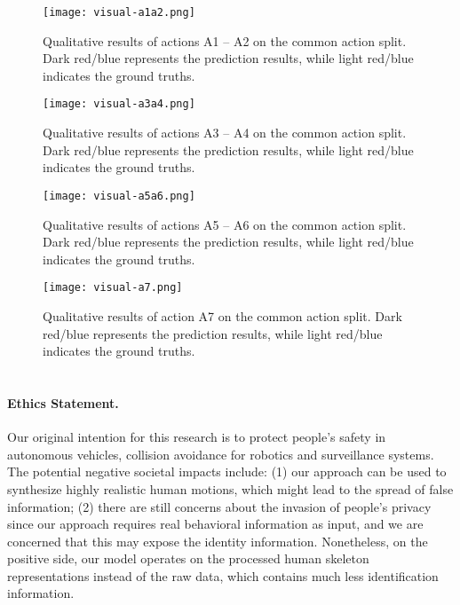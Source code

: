 \documentclass[10pt,twocolumn,letterpaper]{article}
\begin{document}
\begin{figure*}[ht]
	\begin{center}
		\centerline{\texttt{[image: visual-a1a2.png]}} \caption{Qualitative results of actions A1 -- A2 on the common action split. Dark red/blue represents the prediction results, while light red/blue indicates the ground truths. }
		\label{fig:visual_a1a2}
	\end{center}
\end{figure*}


\begin{figure*}[ht]
	\begin{center}
		\centerline{\texttt{[image: visual-a3a4.png]}} \caption{Qualitative results of actions A3 -- A4 on the common action split. Dark red/blue represents the prediction results, while light red/blue indicates the ground truths. }
		\label{fig:visual_a3a4}
	\end{center}
\end{figure*}


\begin{figure*}[ht]
	\begin{center}
		\centerline{\texttt{[image: visual-a5a6.png]}} \caption{Qualitative results of actions A5 -- A6 on the common action split. Dark red/blue represents the prediction results, while light red/blue indicates the ground truths. }
		\label{fig:visual_a5a6}
	\end{center}
\end{figure*}


\begin{figure*}[ht]
	\begin{center}
		\centerline{\texttt{[image: visual-a7.png]}} \caption{Qualitative results of action A7 on the common action split. Dark red/blue represents the prediction results, while light red/blue indicates the ground truths. }
		\label{fig:visual_a7}
	\end{center}
\end{figure*}

\newpage
\section*{}
\paragraph*{Ethics Statement.}
Our original intention for this research is to protect people’s safety in autonomous vehicles, collision avoidance for robotics and surveillance systems. 
The potential negative societal impacts include: 
(1) our approach can be used to synthesize highly realistic human motions, which might lead to the spread of false information; 
(2) there are still concerns about the invasion of people’s privacy since our approach requires real behavioral information as input, and we are concerned that this may expose the identity information. 
Nonetheless, on the positive side, our model operates on the processed human skeleton representations instead of the raw data, which contains much less identification information. 
\end{document}
